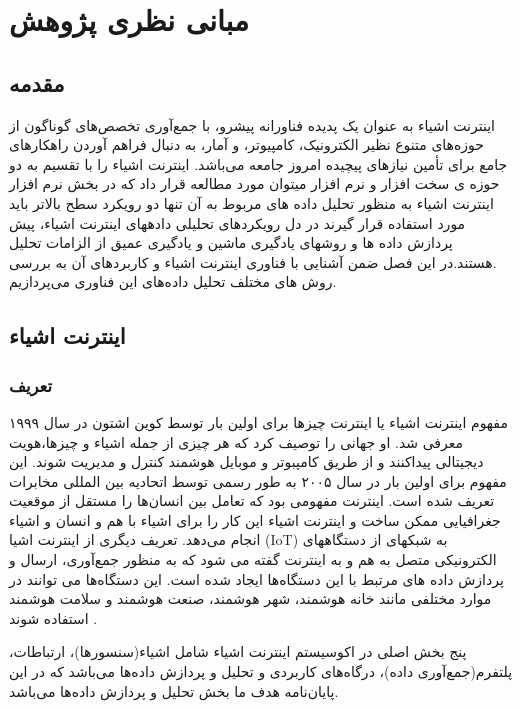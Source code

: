 
\chapter{ مبانی نظری پژوهش} \label{se:rbf}

\section{مقدمه}
اینترنت اشیاء به عنوان یک پدیده فناورانه پیشرو، با جمع‌آوری تخصص‌های گوناگون از حوزه‌های متنوع نظیر الکترونیک، کامپیوتر، و آمار، به دنبال فراهم آوردن راهکارهای جامع برای تأمین نیازهای پیچیده امروز جامعه می‌باشد. اینترنت اشیاء را با تقسیم به دو حوزه ی
سخت افزار و نرم افزار میتوان مورد مطالعه قرار داد که در بخش نرم افزار اینترنت اشیاء به منظور تحلیل داده های مربوط به آن تنها دو رویکرد
سطح بالاتر باید مورد استفاده قرار گیرند در دل رویکردهای تحلیلی دادههای اینترنت اشیاء، پیش پردازش
داده ها و روشهای یادگیری ماشین و یادگیری عمیق از الزامات تحلیل .هستند.در این فصل ضمن آشنایی با فناوری اینترنت اشیاء و کاربردهای آن به بررسی روش های مختلف تحلیل داده‌های این فناوری می‌پردازیم.

\section{اینترنت اشیاء}

\subsection{تعریف }
مفهوم اینترنت اشیاء یا اینترنت چیزها برای اولین بار توسط کوین اشتون در سال ۱۹۹۹ معرفی شد. او جهانی را توصیف کرد که هر چیزی از جمله اشیاء و چیزها،هویت دیجیتالی پیداکنند و از طریق کامپبوتر و موبایل هوشمند کنترل و مدیریت شوند. این مفهوم برای اولین بار در سال ۲۰۰۵ به طور رسمی توسط اتحادیه بین المللی مخابرات تعریف شده است. اینترنت مفهومی بود که تعامل بین انسان‌ها را مستقل از موقعیت جغرافیایی ممکن ساخت و اینترنت اشیاء این کار را برای اشیاء با هم و انسان و اشیاء انجام می‌دهد.
تعریف دیگری از اینترنت اشیا (IoT) به شبکهای از دستگاههای الکترونیکی متصل به هم و به اینترنت گفته می شود که به منظور جمع‌آوری، 
ارسال و پردازش داده های مرتبط با این دستگاه‌ها ایجاد شده است. این دستگاه‌ها می توانند در موارد مختلفی مانند خانه 
هوشمند، شهر هوشمند، صنعت هوشمند و سلامت هوشمند استفاده شوند .

پنج بخش اصلی در اکوسیستم اینترنت اشیاء شامل اشیاء(سنسورها)، ارتباطات، پلتفرم(جمع‌آوری داده)، درگاه‌های کاربردی و تحلیل و پردازش داده‌ها می‌باشد که در این پایان‌نامه هدف ما بخش تحلیل و پردازش داده‌ها می‌باشد.
\cite{Azizi2021}

